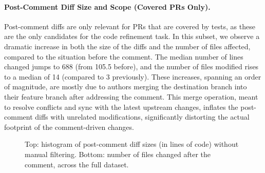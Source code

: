 \paragraph{Post-Comment Diff Size and Scope (Covered PRs Only).}
Post-comment diffs are only relevant for PRs that are covered by tests, as these are the only
candidates for the code refinement task. In this subset, we observe a dramatic increase in both the
size of the diffs and the number of files affected, compared to the situation before the comment.
The median number of lines changed jumps to 688 (from 105.5 before), and the number of files
modified rises to a median of 14 (compared to 3 previously). These increases, spanning an
order of magnitude, are mostly due to authors merging the destination branch into their feature
branch after addressing the comment. This merge operation, meant to resolve conflicts and sync with
the latest upstream changes, inflates the post-comment diffs with unrelated modifications,
significantly distorting the actual footprint of the comment-driven changes.

\begin{figure}[ht]
	\centering

	\vspace{1em}


	\caption{Top: histogram of post-comment diff sizes (in lines of code) without manual filtering. Bottom: number of files changed after the comment, across the full dataset.}
	\label{fig:diff-after}
\end{figure}

